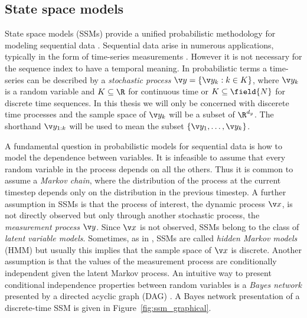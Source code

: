 \subsection{State space models}

State space models (SSMs) provide a unified probabilistic methodology for modeling
sequential data \parencite{ljung1994modeling,durbin2012time,Cappe2005,barber2011bayesian}. Sequential data arise in numerous applications, typically in the form
of time-series measurements . However it is not necessary for the sequence index to have
a temporal meaning. In probabilistic terms a time-series
can be described by a \emph{stochastic process} $\y = \left\{\y_k:k\in K\right\}$, where $\y_k$ is a random
variable and $K\subseteq\R$ for continuous time or $K\subseteq\field{N}$ for discrete time sequences. 
In this thesis we will only be concerned with discerete time processes and the sample space of $\y_k$ will be
a subset of $\R^{d_y}$.
The shorthand $\y_{1:k}$ will be used to mean the subset $\{\y_1,\dots,\y_k\}$. 

A fundamental question in probabilistic models for sequential data is how 
to model the dependence between variables. It is infeasible to assume
that every random variable in the process depends on all the others.
Thus it is common to assume a \emph{Markov chain}, where the distribution of
the process at the current timestep depends only on the distribution in the previous timestep.
A further assumption in SSMs is that the process of interest, the dynamic process $\x$, is not directly observed
but only through another stochastic process, the \emph{measurement process} $\y$. Since
$\x$ is not observed, SSMs belong to the class of \emph{latent variable models}. Sometimes, as in
\textcite{Cappe2005}, SSMs are called \emph{hidden Markov models} (HMM) but usually this implies that
the sample space of $\x$ is discrete. Another assumption is that the values of the measurement process are conditionally independent
given the latent Markov process.
An intuitive way to present conditional independence properties between random
variables is a \emph{Bayes network} presented by a directed acyclic graph (DAG) \parencite{pearl1988probabilistic,Bishop2006}.
A Bayes network presentation of a discrete-time SSM is given in Figure~\ref{fig:ssm_graphical}.

